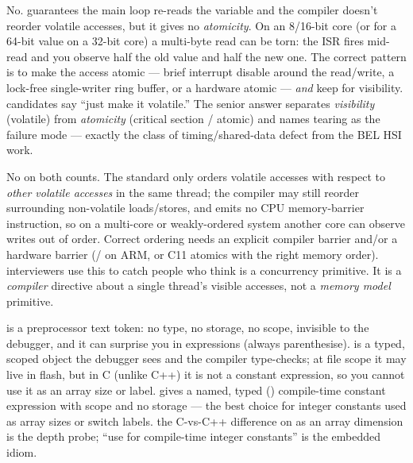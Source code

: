 No.  guarantees the main loop re-reads the variable and the
compiler doesn't reorder volatile accesses, but it gives no \emph{atomicity}.
On an 8/16-bit core (or for a 64-bit value on a 32-bit core) a multi-byte
read can be torn: the ISR fires mid-read and you observe half the old value
and half the new one. The correct pattern is to make the access atomic ---
brief interrupt disable around the read/write, a lock-free single-writer
ring buffer, or a hardware atomic --- \emph{and} keep  for
visibility. \trap candidates say ``just make it volatile.'' The senior answer
separates \emph{visibility} (volatile) from \emph{atomicity}
(critical section / atomic) and names tearing as the failure mode --- exactly
the class of timing/shared-data defect from the BEL HSI work.

No on both counts. The standard only orders volatile accesses with respect to
\emph{other volatile accesses} in the same thread; the compiler may still
reorder surrounding non-volatile loads/stores, and  emits no
CPU memory-barrier instruction, so on a multi-core or weakly-ordered system
another core can observe writes out of order. Correct ordering needs an
explicit compiler barrier and/or a hardware barrier (/ on
ARM, or C11 atomics with the right memory order). \trap interviewers use this
to catch people who think  is a concurrency primitive. It is a
\emph{compiler} directive about a single thread's visible accesses, not a
\emph{memory model} primitive.

 is a preprocessor text token: no type, no storage, no
scope, invisible to the debugger, and it can surprise you in expressions
(always parenthesise).  is a typed, scoped object
the debugger sees and the compiler type-checks; at file scope it may live in
flash, but in C (unlike C++) it is not a constant expression, so you cannot
use it as an array size or  label. 
gives a named, typed () compile-time constant expression with scope
and no storage --- the best choice for integer constants used as array sizes
or switch labels. \trap the C-vs-C++ difference on  as an array
dimension is the depth probe; ``use  for compile-time integer
constants'' is the embedded idiom.

